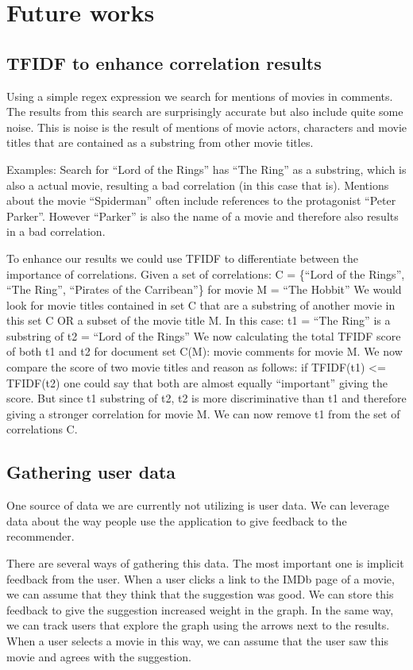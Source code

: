 \section{Future works}
\subsection{TFIDF to enhance correlation results}
Using a simple regex expression we search for mentions of movies in comments. 
The results from this search are surprisingly accurate but also include quite some noise. 
This is noise is the result of mentions of movie actors, characters and movie titles that are contained as a substring from other movie titles. 

Examples:
Search for “Lord of the Rings” has “The Ring” as a substring, which is also a actual movie, resulting a bad correlation (in this case that is). 
Mentions about the movie “Spiderman” often include references to the protagonist “Peter Parker”. However “Parker” is also the name of a movie and therefore also results in a bad correlation.

To enhance our results we could use TFIDF to differentiate between the importance of correlations. 
Given a set of correlations: C = \{“Lord of the Rings”, “The Ring”, “Pirates of the Carribean”\} for movie M = “The Hobbit”
We would look for movie titles contained in set C that are a substring of another movie in this set C OR a subset of the movie title M. 
In this case: t1 = “The Ring” is a substring of t2 = “Lord of the Rings”
We now calculating the total TFIDF score of both t1 and t2 for document set C(M): movie comments for movie M.
We now compare the score of two movie titles and reason as follows:
if TFIDF(t1) <= TFIDF(t2) one could say that both are almost equally “important” giving the score.
But since t1 substring of t2, t2 is more discriminative than t1 and therefore giving a stronger correlation for movie M. 
We can now remove t1 from the set of correlations C.

\subsection{Gathering user data}
One source of data we are currently not utilizing is user data.
We can leverage data about the way people use the application to give feedback to the recommender.

There are several ways of gathering this data.
The most important one is implicit feedback from the user.
When a user clicks a link to the IMDb page of a movie, we can assume that they think that the suggestion was good.
We can store this feedback to give the suggestion increased weight in the graph.
In the same way, we can track users that explore the graph using the arrows next to the results.
When a user selects a movie in this way, we can assume that the user saw this movie and agrees with the suggestion.

